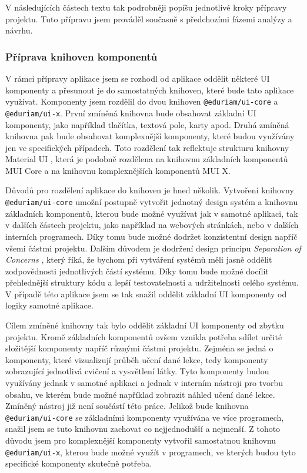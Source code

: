 V následujících částech textu tak podrobněji popíšu jednotlivé kroky přípravy projektu. Tuto přípravu jsem prováděl současně s předchozími fázemi analýzy a návrhu.

\subsubsection{Příprava knihoven komponentů}

V rámci přípravy aplikace jsem se rozhodl od aplikace oddělit některé UI komponenty a přesunout je do samostatných knihoven, které bude tato aplikace využívat. Komponenty jsem rozdělil do dvou knihoven \texttt{@eduriam/ui-core} a \texttt{@eduriam/ui-x}. První zmíněná knihovna bude obsahovat základní UI komponenty, jako například tlačítka, textová pole, karty apod. Druhá zmíněná knihovna pak bude obsahovat komplexnější komponenty, které budou využívány jen ve specifických případech. Toto rozdělení tak reflektuje strukturu knihovny Material UI \cite{MaterialUI}, která je podobně rozdělena na knihovnu základních komponentů MUI Core a na knihovnu komplexnějších komponentů MUI X.

Důvodů pro rozdělení aplikace do knihoven je hned několik. Vytvoření knihovny \texttt{@eduriam/ui-core} umožní postupně vytvořit jednotný design systém a knihovnu základních komponentů, kterou bude možné využívat jak v samotné aplikaci, tak v dalších částech projektu, jako například na webových stránkách, nebo v dalších interních programech. Díky tomu bude možné dodržet konzistentní design napříč všemi částmi projektu. Dalším důvodem je dodržení design principu \textit{Separation of Concerns} \cite[36]{ADPArchitectures}, který říká, že bychom při vytváření systémů měli jasně oddělit zodpovědnosti jednotlivých částí systému. Díky tomu bude možné docílit přehlednější struktury kódu a lepší testovatelnosti a udržitelnosti celého systému. V případě této aplikace jsem se tak snažil oddělit základní UI komponenty od logiky samotné aplikace.

Cílem zmíněné knihovny tak bylo oddělit základní UI komponenty od zbytku projektu. Kromě základních komponentů ovšem vznikla potřeba sdílet určité složitější komponenty napříč různými částmi projektu. Zejména se jedná o komponenty, které vizualizují průběh učení dané lekce, tedy komponenty zobrazující jednotlivá cvičení a vysvětlení látky. Tyto komponenty budou využívány jednak v samotné aplikaci a jednak v interním nástroji pro tvorbu obsahu, ve kterém bude možné například zobrazit náhled učení dané lekce. Zmíněný nástroj již není součástí této práce. Jelikož bude knihovna \texttt{@eduriam/ui-core} se základními komponenty využívána ve více programech, snažil jsem se tuto knihovnu zachovat co nejjednodušší a nejmenší. Z tohoto důvodu jsem pro komplexnější komponenty vytvořil samostatnou knihovnu \texttt{@eduriam/ui-x}, kterou bude možné využít v programech, ve kterých budou tyto specifické komponenty skutečně potřeba.

